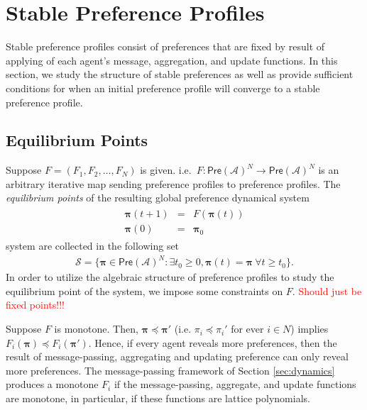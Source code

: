 \documentclass[conference]{ieeeconf}
\newcommand{\A}{\mathcal{A}}
\renewcommand{\SS}{\mathcal{S}}
\newcommand{\Pref}{\mathsf{Pre}}
\newcommand{\profile}{\boldsymbol{\pi}}
\renewcommand{\geq}{\geqslant}
\begin{document}
\section{Stable Preference Profiles}
\label{sec:stable}

Stable preference profiles consist of preferences that are fixed by result of applying of each agent's message, aggregation, and update functions. In this section, we study the structure of stable preferences as well as provide sufficient conditions for when an initial preference profile will converge to a stable preference profile.

\subsection{Equilibrium Points}

Suppose $F = (F_1,F_2,\dots,F_N)$ is given. i.e.~$F: \Pref(\A)^N \to \Pref(\A)^N$ is an arbitrary iterative map sending preference profiles to preference profiles. The \emph{equilibrium points} of the resulting global preference dynamical system
\begin{align}
    \begin{aligned}
        \profile(t+1) &=& F\left( \profile(t) \right) \\
        \profile(0) &=& \profile_0
    \end{aligned} \label{eq:global-pi}
\end{align}
system are collected in the following set
\begin{align*}
    \SS = \{\profile \in \Pref(\A)^N : \exists t_0 \geq 0, \profile(t) = \profile~\forall t \geq t_0\}.
\end{align*}
In order to utilize the algebraic structure of preference profiles to study the equilibrium point of the system, we impose some constraints on $F$. \textcolor{red}{Should just be fixed points!!!}

Suppose $F$ is monotone. Then, $\profile \preceq \profile'$ (i.e. $\pi_i \preceq \pi_i'$ for ever $i \in N$) implies $F_i(\profile) \preceq F_i(\profile')$. Hence, if every agent reveals more preferences, then the result of message-passing, aggregating and updating preference can only reveal more preferences. The message-passing framework of Section \ref{sec:dynamics} produces a monotone $F_i$ if the message-passing, aggregate, and update functions are monotone, in particular, if these functions are lattice polynomials.
\end{document}
